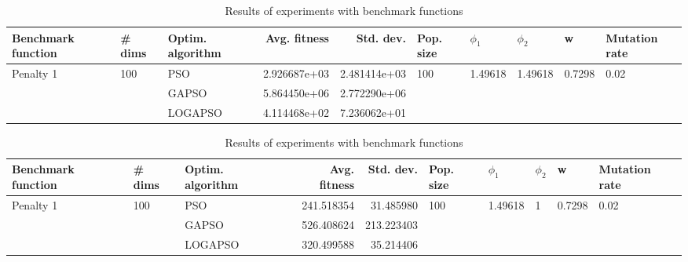 \documentclass{article}
\begin{document}
\begin{table}
\centering
\caption{Results of experiments with benchmark functions}
\begin{tabular}{lllrrlllll}
\toprule
        Benchmark function &              \# dims & Optim. algorithm &  Avg. fitness &    Std. dev. &            Pop. size &               $\phi_{1}$ &               $\phi_{2}$ &                       w &         Mutation rate \\
\midrule
\multirow{3}{*}{Penalty 1} & \multirow{3}{*}{100} &              PSO &  2.926687e+03 & 2.481414e+03 & \multirow{3}{*}{100} & \multirow{3}{*}{1.49618} & \multirow{3}{*}{1.49618} & \multirow{3}{*}{0.7298} & \multirow{3}{*}{0.02} \\
                           &                      &            GAPSO &  5.864450e+06 & 2.772290e+06 &                      &                          &                          &                         &                       \\
                           &                      &          LOGAPSO &  4.114468e+02 & 7.236062e+01 &                      &                          &                          &                         &                       \\
\bottomrule
\end{tabular}
\end{table}
\begin{table}
\centering
\caption{Results of experiments with benchmark functions}
\begin{tabular}{lllrrlllll}
\toprule
        Benchmark function &              \# dims & Optim. algorithm &  Avg. fitness &  Std. dev. &            Pop. size &               $\phi_{1}$ &         $\phi_{2}$ &                       w &         Mutation rate \\
\midrule
\multirow{3}{*}{Penalty 1} & \multirow{3}{*}{100} &              PSO &    241.518354 &  31.485980 & \multirow{3}{*}{100} & \multirow{3}{*}{1.49618} & \multirow{3}{*}{1} & \multirow{3}{*}{0.7298} & \multirow{3}{*}{0.02} \\
                           &                      &            GAPSO &    526.408624 & 213.223403 &                      &                          &                    &                         &                       \\
                           &                      &          LOGAPSO &    320.499588 &  35.214406 &                      &                          &                    &                         &                       \\
\bottomrule
\end{tabular}
\end{table}
\end{document}
